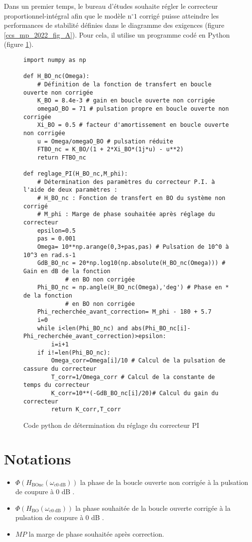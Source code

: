 Dans un premier temps, le bureau d'études souhaite régler le correcteur proportionnel-intégral afin que le modèle $\mathrm{n}^{\circ} 1$ corrigé puisse atteindre les performances de stabilité définies dans le diagramme des exigences (figure \ref{ccs_mp_2022_fig_A}). Pour cela, il utilise un programme codé en Python (figure \ref{ccs_mp_2022_fig_10}).
\begin{figure}
\centering
\begin{lstlisting}
import numpy as np

def H_BO_nc(Omega):
    # Définition de la fonction de transfert en boucle ouverte non corrigée
    K_BO = 8.4e-3 # gain en boucle ouverte non corrigée
    omegaO_BO = 71 # pulsation propre en boucle ouverte non corrigée
    Xi_BO = 0.5 # facteur d'amortissement en boucle ouverte non corrigée
    u = Omega/omegaO_BO # pulsation réduite
    FTBO_nc = K_BO/(1 + 2*Xi_BO*(1j*u) - u**2)
    return FTBO_nc
    
def reglage_PI(H_BO_nc,M_phi):
    # Détermination des paramètres du correcteur P.I. à l'aide de deux paramètres :
    # H_BO_nc : Fonction de transfert en BO du système non corrigé
    # M_phi : Marge de phase souhaitée après réglage du correcteur
    epsilon=0.5
    pas = 0.001
    Omega= 10**np.arange(0,3+pas,pas) # Pulsation de 10^0 à 10^3 en rad.s-1
    GdB_BO_nc = 20*np.log10(np.absolute(H_BO_nc(Omega))) # Gain en dB de la fonction
            # en BO non corrigée
    Phi_BO_nc = np.angle(H_BO_nc(Omega),'deg') # Phase en * de la fonction
            # en BO non corrigée
    Phi_recherchée_avant_correction= M_phi - 180 + 5.7
    i=0
    while i<len(Phi_BO_nc) and abs(Phi_BO_nc[i]-Phi_recherchée_avant_correction)>epsilon:
        i=i+1
    if i!=len(Phi_BO_nc):
        Omega_corr=Omega[i]/10 # Calcul de la pulsation de cassure du correcteur
        T_corr=1/Omega_corr # Calcul de la constante de temps du correcteur
        K_corr=10**(-GdB_BO_nc[i]/20)# Calcul du gain du correcteur
        return K_corr,T_corr
\end{lstlisting}

\caption{\label{ccs_mp_2022_fig_10}Code python de détermination du réglage du correcteur PI}
\end{figure}

\section*{Notations}
\begin{itemize}
  \item $\Phi\left(H_{\mathrm{BOnc}}\left(\omega_{c 0 \mathrm{~dB}}\right)\right)$ la phase de la boucle ouverte non corrigée à la pulsation de coupure à 0 dB .
  \item $\Phi\left(H_{\mathrm{BO}}\left(\omega_{c 0 \mathrm{~dB}}\right)\right)$ la phase souhaitée de la boucle ouverte corrigée à la pulsation de coupure à 0 dB .
  \item $M P$ la marge de phase souhaitée après correction.
\end{itemize}



